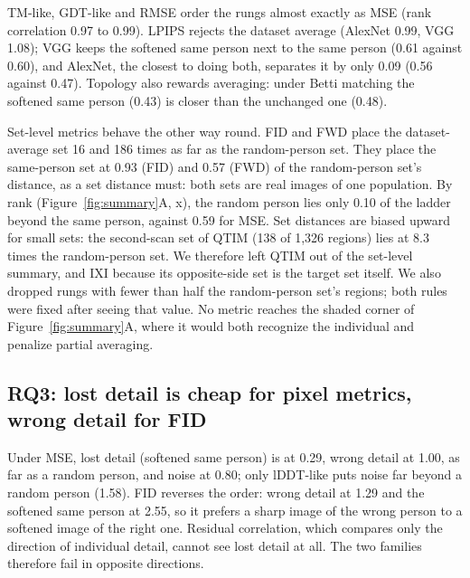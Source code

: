 \ac{TM}-like, \ac{GDT}-like and \ac{RMSE} order the rungs almost exactly as \ac{MSE} (rank correlation 0.97 to 0.99).
\ac{LPIPS} rejects the dataset average (AlexNet 0.99, VGG 1.08); VGG keeps the softened same person next to the same person (0.61 against 0.60), and AlexNet, the closest to doing both, separates it by only 0.09 (0.56 against 0.47).
Topology also rewards averaging: under Betti matching the softened same person (0.43) is closer than the unchanged one (0.48).

Set-level metrics behave the other way round.
\ac{FID} and \ac{FWD} place the dataset-average set 16 and 186 times as far as the random-person set.
They place the same-person set at 0.93 (\ac{FID}) and 0.57 (\ac{FWD}) of the random-person set's distance, as a set distance must: both sets are real images of one population.
By rank (Figure~\ref{fig:summary}A, x), the random person lies only 0.10 of the ladder beyond the same person, against 0.59 for \ac{MSE}.
Set distances are biased upward for small sets: the second-scan set of QTIM (138 of 1{,}326 regions) lies at 8.3 times the random-person set.
We therefore left QTIM out of the set-level summary, and IXI because its opposite-side set is the target set itself.
We also dropped rungs with fewer than half the random-person set's regions; both rules were fixed after seeing that value.
No metric reaches the shaded corner of Figure~\ref{fig:summary}A, where it would both recognize the individual and penalize partial averaging.

\subsection{RQ3: lost detail is cheap for pixel metrics, wrong detail for \acs{FID}}
Under \ac{MSE}, lost detail (softened same person) is at 0.29, wrong detail at 1.00, as far as a random person, and noise at 0.80\statuspre; only \ac{lDDT}-like puts noise far beyond a random person (1.58).
\ac{FID} reverses the order: wrong detail at 1.29 and the softened same person at 2.55, so it prefers a sharp image of the wrong person to a softened image of the right one\statuspre.
Residual correlation, which compares only the direction of individual detail, cannot see lost detail at all.
The two families therefore fail in opposite directions.
